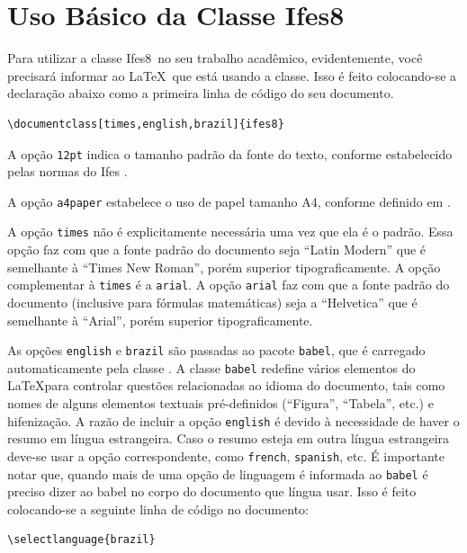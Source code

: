 \documentclass[times,english,brazil,oneside,section=TITLE]{ifes8}
\newcommand{\ifestex}{\textsf{Ifes$8$}}
\begin{document}
\section{Uso Básico da Classe Ifes8}
\label{sec:uso-basico}

Para utilizar a classe \ifestex\ no seu trabalho acadêmico,
evidentemente, você precisará informar ao \LaTeX\ que está usando a
classe. Isso é feito colocando-se a declaração abaixo como a primeira
linha de código do seu documento.\vspace{\baselineskip}

\begin{lstlisting}[language={[LaTeX]TeX}]
  \documentclass[times,english,brazil]{ifes8}  
\end{lstlisting}

A opção \texttt{12pt} indica o tamanho padrão da fonte do texto,
conforme estabelecido pelas normas do Ifes \cite[pp.~20]{Ifes2017}.

A opção \texttt{a4paper} estabelece o uso de papel tamanho A4,
conforme definido em \cite[pp.~19]{Ifes2017}.

A opção \texttt{times} não é explicitamente necessária uma vez que ela
é o padrão. Essa opção faz com que a fonte padrão do documento seja
“Latin Modern” que é semelhante à “Times New Roman”, porém superior
tipograficamente. A opção complementar à \texttt{times} é a
\texttt{arial}. A opção \texttt{arial} faz com que a fonte padrão do
documento (inclusive para fórmulas matemáticas) seja a “Helvetica” que
é semelhante à “Arial”, porém superior tipograficamente.

As opções \texttt{english} e \texttt{brazil} são passadas ao pacote
\texttt{babel}, que é carregado automaticamente pela classe \abnTeX.
A classe \texttt{babel} redefine vários elementos do \LaTeX para
controlar questões relacionadas ao idioma do documento, tais como
nomes de alguns elementos textuais pré-definidos (``Figura'',
``Tabela'', etc.) e hifenização. A razão de incluir a opção
\texttt{english} é devido à necessidade de haver o resumo em língua
estrangeira. Caso o resumo esteja em outra língua estrangeira deve-se
usar a opção correspondente, como \texttt{french}, \texttt{spanish},
etc. É importante notar que, quando mais de uma opção de linguagem é
informada ao \texttt{babel} é preciso dizer ao babel no corpo do
documento que língua usar. Isso é feito colocando-se a seguinte linha
de código no documento:\vspace{\baselineskip}

\begin{lstlisting}[language={[LaTeX]TeX}]
  \selectlanguage{brazil}  
\end{lstlisting}
\end{document}
